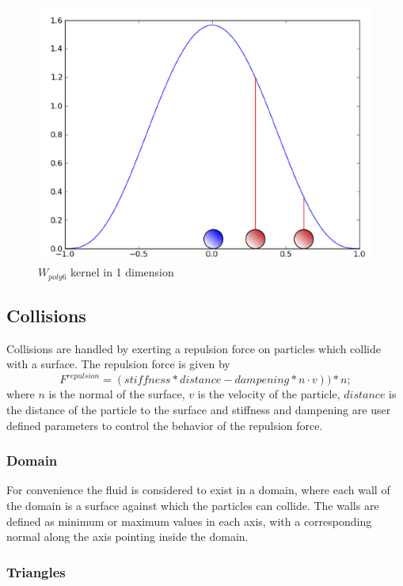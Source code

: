 \begin{figure}[!htc]
 		\centering
		\includegraphics[scale=0.6]{figures/poly6kernel.png}
        \caption{ $W_{poly6}$ kernel in 1 dimension }
		\label{fig:poly6kernel}
\end{figure}


\subsection{Collisions}

Collisions are handled by exerting a repulsion force on particles which collide
with a surface. The repulsion force is given by
$$
F^{repulsion} = (stiffness * distance - dampening * n \cdot v))*n;
$$
where $n$ is the normal of the surface, $v$ is the velocity of the particle,
$distance$ is the distance of the particle to the surface and
stiffness and dampening are user defined parameters to control the behavior of
the repulsion force.\cite{Krog2010}

\subsubsection{Domain}
For convenience the fluid is considered to exist in a domain, where each wall
of the domain is a surface against which the particles can collide. The walls
are defined as minimum or maximum values in each axis, with a corresponding
normal along the axis pointing inside the domain. 

\subsubsection{Triangles}

